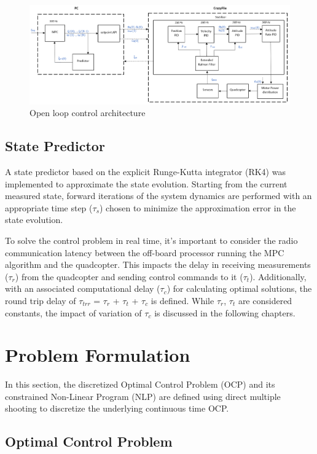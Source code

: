 \documentclass[conference]{IEEEtran}
\begin{document}
\begin{figure}[htbp]
	\centerline{\includegraphics[scale = 0.6]{figures/Screenshot_OL.png} }
	\caption{Open loop control architecture }
	\label{Fig2}
\end{figure}

\subsection{State Predictor}

A state predictor based on the explicit Runge-Kutta integrator (RK4) was implemented to approximate the state evolution. Starting from the current measured state, forward iterations of the system dynamics are performed with an appropriate time step ($\tau_{s}$) chosen to minimize the approximation error in the state evolution.

To solve the control problem in real time, it's important to consider the radio communication latency between the off-board processor running the MPC algorithm and the quadcopter. This impacts the delay in receiving measurements ($\tau_{r}$) from the quadcopter and sending control commands to it ($\tau_{t}$). Additionally, with an associated computational delay ($\tau_{c}$) for calculating optimal solutions, the round trip delay of $\tau_{trr}$ = $\tau_r$ + $\tau_t$ + $\tau_c$ is defined. While $\tau_{r}$, $\tau_{t}$ are considered constants, the impact of variation of $\tau_{c}$ is discussed in the following chapters.

\section{Problem Formulation}\label{Section3}

In this section, the discretized Optimal Control Problem (OCP) and its constrained Non-Linear Program (NLP) are defined using direct multiple shooting \cite{bock_multiple_1984} to discretize the underlying continuous time OCP.

\subsection{Optimal Control Problem}
\end{document}
